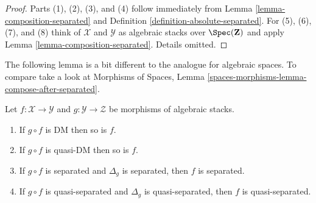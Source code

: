 \begin{proof}
Parts (1), (2), (3), and (4) follow immediately from
Lemma \ref{lemma-composition-separated}
and
Definition \ref{definition-absolute-separated}.
For (5), (6), (7), and (8) think of $\mathcal{X}$ and $\mathcal{Y}$ as
algebraic stacks over $\Spec(\mathbf{Z})$ and apply
Lemma \ref{lemma-composition-separated}.
Details omitted.
\end{proof}

\noindent
The following lemma is a bit different to the analogue for algebraic
spaces. To compare take a look at
Morphisms of Spaces,
Lemma \ref{spaces-morphisms-lemma-compose-after-separated}.

\begin{lemma}
\label{lemma-compose-after-separated}
Let $f : \mathcal{X} \to \mathcal{Y}$ and
$g : \mathcal{Y} \to \mathcal{Z}$ be morphisms of algebraic stacks.
\begin{enumerate}
\item If $g \circ f$ is DM then so is $f$.
\item If $g \circ f$ is quasi-DM then so is $f$.
\item If $g \circ f$ is separated and $\Delta_g$ is separated, then
$f$ is separated.
\item If $g \circ f$ is quasi-separated and
$\Delta_g$ is quasi-separated, then $f$ is quasi-separated.
\end{enumerate}
\end{lemma}

